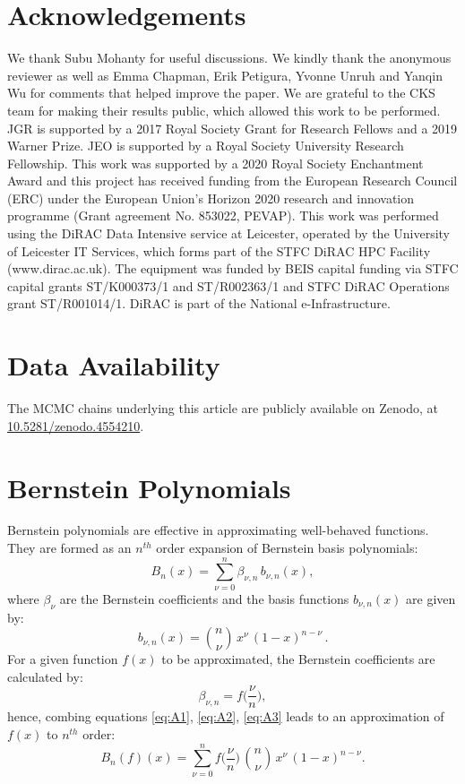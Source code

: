 \documentclass[fleqn,usenatbib]{mnras}
\newcommand{\correction}{\color{black}}
\begin{document}
\section*{Acknowledgements}
We thank Subu Mohanty for useful discussions. {\correction We kindly thank the anonymous reviewer} as well as Emma Chapman, Erik Petigura, Yvonne Unruh and Yanqin Wu for comments that helped improve the paper. We are grateful to the CKS team for making their results public, which allowed this work to be performed. JGR is supported by a 2017 Royal Society Grant for Research Fellows and a 2019 Warner Prize. JEO is supported by a Royal Society University Research Fellowship. This work was supported by a 2020 Royal Society Enchantment Award and this project has received funding from the European Research Council (ERC) under the European Union's Horizon 2020 research and innovation programme (Grant agreement No. 853022, PEVAP). This work was performed using the DiRAC Data Intensive service at Leicester, operated by the University
of Leicester IT Services, which forms part of the STFC
DiRAC HPC Facility (www.dirac.ac.uk). The equipment
was funded by BEIS capital funding via STFC capital grants
ST/K000373/1 and ST/R002363/1 and STFC DiRAC Operations grant ST/R001014/1. DiRAC is part of the National e-Infrastructure.

\section*{Data Availability}
The MCMC chains underlying this article are publicly available on Zenodo, at \href{https://doi.org/10.5281/zenodo.4554210}{10.5281/zenodo.4554210}.


\appendix

\section{Bernstein Polynomials} \label{app:Bernstein}
Bernstein polynomials are effective in approximating well-behaved functions. They are formed as an $n^{th}$ order expansion of Bernstein basis polynomials:
\begin{equation} \label{eq:A1}
    B_n(x) = \sum^n_{\nu=0} \beta_{\nu,n} \, b_{\nu,n}(x),
\end{equation}
where $\beta_\nu$ are the Bernstein coefficients and the basis functions $b_{\nu,n}(x)$ are given by:
\begin{equation} \label{eq:A2}
    b_{\nu,n}(x) = \binom n \nu \, x^\nu \, (1-x)^{n-\nu} \,.
\end{equation}
For a given function $f(x)$ to be approximated, the Bernstein coefficients are calculated by:
\begin{equation} \label{eq:A3}
    \beta_{\nu,n} = f \bigg ( \frac{\nu}{n} \bigg) , 
\end{equation}
hence, combing equations \ref{eq:A1}, \ref{eq:A2}, \ref{eq:A3} leads to an approximation of $f(x)$ to $n^{th}$ order:
\begin{equation} \label{eq:Bernstein}
    B_n(f)(x) = \sum^n_{\nu=0} f \bigg ( \frac{\nu}{n} \bigg) \, \binom n \nu \, x^\nu \, (1-x)^{n-\nu}.
\end{equation}
\end{document}
